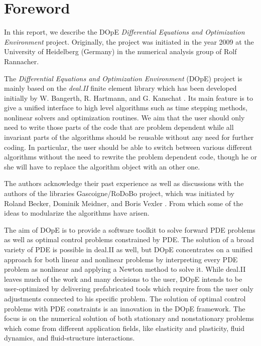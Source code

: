 \chapter{Foreword}
In this report, we describe the DOpE
\textit{Differential Equations and  Optimization Environment} project. 
Originally, the project was initiated in the year 2009 at the 
University of Heidelberg (Germany) in the numerical analysis
group of Rolf Rannacher. 

The \textit{Differential Equations and  Optimization Environment} (DOpE) project is 
mainly based on the \textit{deal.II} finite element library which has been developed
 initially by W. Bangerth, R. Hartmann, and G. Kanschat \cite{deal}.
Its main feature is to give a unified interface to high level algorithms such as 
time stepping methods, nonlinear solvers and optimization routines. 
We aim that the user should only need to write those parts
of the code that are problem dependent while all invariant parts of the algorithms
should be reusable without any need for further coding.
In particular, the user should be able to switch between various different 
algorithms without the need to rewrite the problem dependent code, though he or she will
have to replace the algorithm object with an other one. 

The authors acknowledge their past experience as well as discussions with 
the authors of the libraries 
Gascoigne/RoDoBo project, which was initiated by 
Roland Becker, Dominik Meidner,  and Boris Vexler \cite{rodobo}. 
From which some of the ideas to modularize the algorithms have arisen.

The aim of DOpE is to provide a software toolkit to solve forward PDE
problems as well as optimal control problems constrained by PDE. The
solution of a broad variety of PDE is possible in deal.II as well, but
DOpE concentrates on a unified approach for both linear and nonlinear
problems by interpreting every PDE problem as nonlinear and applying a
Newton method to solve it. While deal.II leaves much of the work and many
decisions to the user, DOpE intends to be user-optimized by delivering
prefabricated tools which require from the user only adjustments connected
to his specific problem. The solution of optimal control problems with PDE
constraints is an innovation in the DOpE framework.
The focus is on the numerical solution of both stationary and nonstationary
problems which come from different application fields, like elasticity and
plasticity, fluid dynamics, and fluid-structure interactions.

